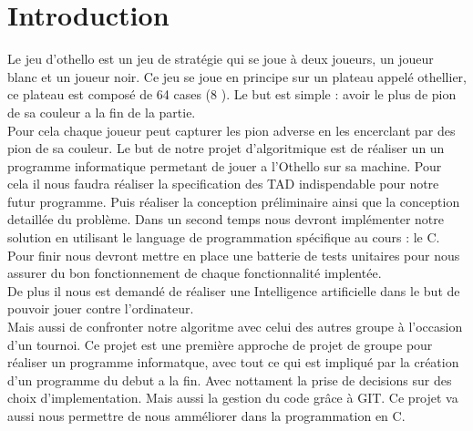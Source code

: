 \section{Introduction}
Le jeu d'othello est un jeu de stratégie qui se joue à deux joueurs, un joueur blanc et un joueur noir. 
Ce jeu se joue en principe sur un plateau appelé othellier, ce plateau est composé de 64 cases (8 ).
Le but est simple : avoir le plus de pion de sa couleur a la fin de la partie.\\
Pour cela chaque joueur peut capturer les pion adverse en les encerclant par des pion de sa couleur. 
 Le but de notre projet d'algoritmique est de réaliser un  un programme informatique permetant de jouer a l'Othello sur sa machine.
Pour cela il nous faudra réaliser la specification des TAD indispendable pour notre futur programme. Puis réaliser la conception préliminaire ainsi que la conception detaillée du problème.
Dans un second temps nous devront implémenter notre solution en utilisant le language de programmation spécifique au cours : le C. 
Pour finir nous devront mettre en place une batterie de tests unitaires pour nous assurer du bon fonctionnement de chaque fonctionnalité implentée.\\
De plus il nous est demandé de réaliser une Intelligence artificielle dans le but de pouvoir jouer contre l'ordinateur.\\
Mais aussi de confronter notre algoritme avec celui des autres groupe à l'occasion d'un tournoi.
Ce projet est une première approche de projet de groupe pour réaliser un programme informatque, avec tout ce qui est impliqué par la création d'un programme du debut a la fin.
Avec nottament la prise de decisions sur des choix d'implementation. Mais aussi la gestion du code grâce à GIT.  
 Ce projet va  aussi nous permettre  de nous amméliorer dans la programmation en C.
 

